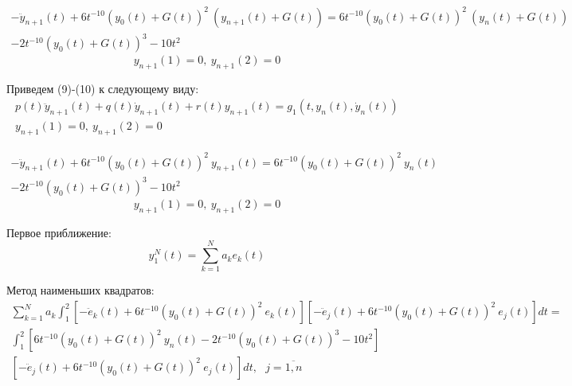 \documentclass[12pt]{article}
\begin{document}
\begin{multline}
-\ddot{y}_{n+1}(t) + 6t^{-10}(y_0(t) + G(t))^2\ (y_{n+1}(t) + G(t)) =
 6t^{-10}(y_0(t) + G(t))^2\ (y_n(t) + G(t)) \\- 2t^{-10}(y_0(t) + G(t))^3 - 10t^2
\end{multline}
\begin{equation}
y_{n+1}(1)=0,\ y_{n+1}(2)=0
\end{equation}

Приведем (9)-(10) к следующему виду:
\begin{gather}
p(t)\ddot{y}_{n+1}(t) + q(t)\dot{y}_{n+1}(t) + r(t)y_{n+1}(t) = g_1(t, y_n(t), \dot{y}_n(t)) \\
y_{n+1}(1) = 0,\ y_{n+1}(2) = 0
\end{gather}

\begin{multline}
-\ddot{y}_{n+1}(t) + 6t^{-10}(y_0(t) + G(t))^2\ y_{n+1}(t) =
6t^{-10}(y_0(t) + G(t))^2\ y_n(t) \\- 2t^{-10}(y_0(t) + G(t))^3 - 10t^2
\end{multline}
\begin{equation}
y_{n+1}(1) = 0,\ y_{n+1}(2) = 0
\end{equation}

Первое приближение:
\begin{equation}
y_1^N(t) = \sum_{k = 1}^{N}a_ke_k(t)
\end{equation}

Метод наименьших квадратов:
\begin{multline}
\sum_{k = 1}^{N}a_k \int_1^2 [-\ddot{e}_k(t) + 6t^{-10}(y_0(t) + G(t))^2\ e_k(t)]
[-\ddot{e}_j(t) + 6t^{-10}(y_0(t) + G(t))^2\ e_j(t)]dt = \\
\int_1^2[6t^{-10}(y_0(t)+G(t))^2\ y_n(t) - 2t^{-10}(y_0(t)+G(t))^3 - 10t^2]\\ [-\ddot{e}_j(t) + 6t^{-10}(y_0(t) + G(t))^2\ e_j(t)]dt,\ \ \
j = \overline{1,n}
\end{multline}
\end{document}
